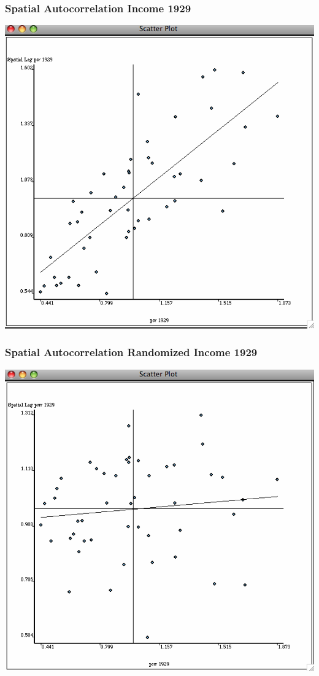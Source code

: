 \documentclass[nototal,handout]{beamer}
\begin{document}
\begin{frame}
	\frametitle{Spatial Autocorrelation Income 1929}
 \begin{center}
 \includegraphics[width=.65\linewidth]{moran29.png}
  \end{center}
 \end{frame} 

\begin{frame}
	\frametitle{Spatial Autocorrelation Randomized Income 1929}
 \begin{center}
 \includegraphics[width=.65\linewidth]{moran29random.png}
  \end{center}
 \end{frame} 
\end{document}
